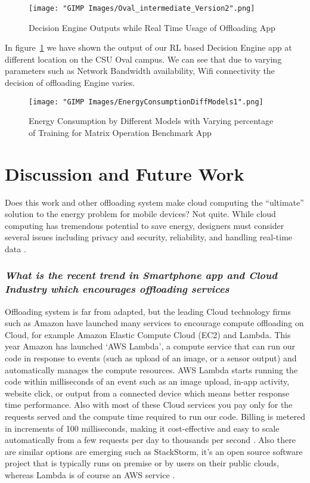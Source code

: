 \documentclass[12pt]{report}
\begin{document}
\begin{figure}[h!]
  \centering
  \texttt{[image: "GIMP Images/Oval\_intermediate\_Version2".png]}
  \caption{Decision Engine Outputs while Real Time Usage of Offloading App}
  \label{fig:Oval_intermediate_Version2}
\end{figure}

In figure~\ref{fig:Oval_intermediate_Version2} we have shown the output of our RL based Decision Engine app at different location on the CSU Oval campus. We can see that due to varying parameters such as Network Bandwidth availability, Wifi connectivity the decision of offloading Engine varies.
\begin{figure}[h!]
  \centering
  \texttt{[image: "GIMP Images/EnergyConsumptionDiffModels1".png]}
  \caption{Energy Consumption by Different Models with Varying percentage of Training for Matrix Operation Benchmark App}
  \label{fig:EnergyConsumptionDiffModels}
\end{figure}

\chapter{Discussion and Future Work} %
Does this work and other offloading system make cloud computing the “ultimate” solution to the energy problem for mobile devices? Not
quite. While cloud computing has tremendous potential to save energy, designers must consider several issues including privacy and security, reliability, and handling real-time data \cite{kumar2010cloud}.

\subsection{\textit{What is the recent trend in Smartphone app and Cloud Industry which encourages offloading services}}
Offloading system is far from adapted, but the leading Cloud technology firms such as Amazon have launched many services to encourage compute offloading on Cloud, for example Amazon Elastic Compute Cloud (EC2) and Lambda. This year Amazon has launched `AWS Lambda', a compute service that can run our code in response to events (such as upload of an image, or a sensor output) and automatically manages the compute resources. AWS Lambda starts running the code within milliseconds of an event such as an image upload, in-app activity, website click, or output from a connected device which means better response time performance. Also with most of these Cloud services you pay only for the requests served and the compute time required to run our code. Billing is metered in increments of 100 milliseconds, making it cost-effective and easy to scale automatically from a few requests per day to thousands per second \cite{AmazonLambda}.
Also there are similar options are emerging such as StackStorm, it's an open source software project that is typically runs on premise or by users on their public clouds, whereas Lambda is of course an AWS service \cite{StackStorm}.
\end{document}
